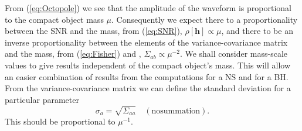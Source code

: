 \documentclass[useAMS,usedcolumn,usegraphicx,usenatbib]{mn2e}
\newcommand{\eqnref}[1]{(\ref{eq:#1})}
\begin{document}
From \eqnref{Octopole} we see that the amplitude of the waveform is proportional to the compact object mass $\mu$. Consequently we expect there to a proportionality between the SNR and the mass, from \eqnref{SNR}, $\rho[\boldsymbol{h}] \propto \mu$, and there to be an inverse proportionality between the elements of the variance-covariance matrix and the mass, from \eqnref{Fisher} and , $\Sigma_{ab} \propto \mu^{-2}$. We shall consider mass-scale values to give results independent of the compact object's mass. This will allow an easier combination of results from the computations for a NS and for a BH. From the variance-covariance matrix we can define the standard deviation for a particular parameter
\begin{equation}
\sigma_a = \sqrt{\Sigma_{aa}} \quad \mathrm{(no summation)}.
\end{equation}
This should be proportional to $\mu^{-1}$.
\end{document}
